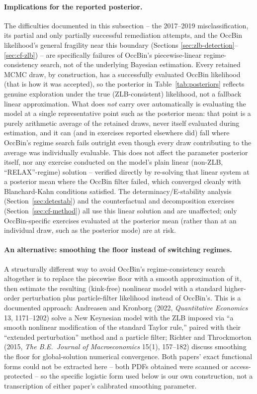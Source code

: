 \documentclass[11pt]{article}
\begin{document}
\paragraph{Implications for the reported posterior.} The difficulties
documented in this subsection -- the 2017--2019 misclassification, its
partial and only partially successful remediation attempts, and the
OccBin likelihood's general fragility near this boundary (Sections
\ref{sec:zlb-detection}--\ref{sec:cf-zlb}) -- are specifically failures of
OccBin's piecewise-linear regime-consistency search, not of the underlying
Bayesian estimation. Every retained MCMC draw, by construction, has a
successfully evaluated OccBin likelihood (that is how it was accepted),
so the posterior in Table~\ref{tab:posteriors} reflects genuine exploration
under the true (ZLB-consistent) likelihood, not a fallback linear
approximation. What does \emph{not} carry over automatically is evaluating
the model at a single representative point such as the posterior mean:
that point is a purely arithmetic average of the retained draws, never
itself evaluated during estimation, and it can (and in exercises reported
elsewhere did) fall where OccBin's regime search fails outright even
though every draw contributing to the average was individually
evaluable. This does not affect the parameter posterior itself, nor any
exercise conducted on the model's plain linear (non-ZLB, ``RELAX''-regime)
solution -- verified directly by re-solving that linear system at a
posterior mean where the OccBin filter failed, which converged cleanly
with Blanchard-Kahn conditions satisfied. The determinacy/E-stability
analysis (Section~\ref{sec:detestab}) and the counterfactual and
decomposition exercises (Section~\ref{sec:cf-method}) all use this linear
solution and are unaffected; only OccBin-specific exercises evaluated at
the posterior mean (rather than at an individual draw, such as the
posterior mode) are at risk.

\paragraph{An alternative: smoothing the floor instead of switching
regimes.} A structurally different way to avoid OccBin's
regime-consistency search altogether is to replace the piecewise floor
with a smooth approximation of it, then estimate the resulting (kink-free)
nonlinear model with a standard higher-order perturbation plus
particle-filter likelihood instead of OccBin's. This is a documented
approach: Andreasen and Kronborg (2022, \emph{Quantitative Economics} 13,
1171--1202) solve a New Keynesian model with the ZLB imposed via ``a
smooth nonlinear modification of the standard Taylor rule,'' paired with
their ``extended perturbation'' method and a particle filter; Richter and
Throckmorton (2015, \emph{The B.E.\ Journal of Macroeconomics} 15(1),
157--182) discuss smoothing the floor for global-solution numerical
convergence. Both papers' exact functional forms could not be extracted
here -- both PDFs obtained were scanned or access-protected -- so the
specific logistic form used below is our own construction, not a
transcription of either paper's calibrated smoothing parameter.
\end{document}
